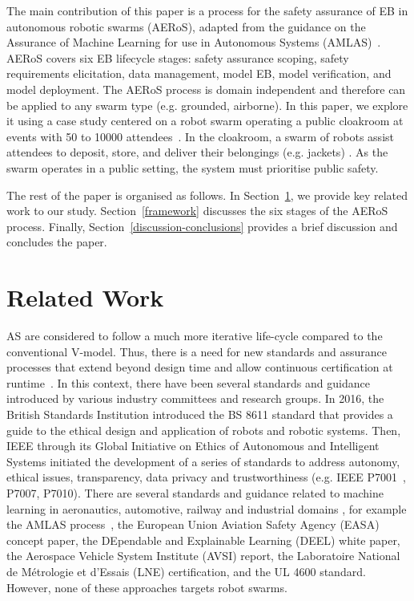 \documentclass{article}
\begin{document}
The main contribution of this paper is a process for the safety assurance of EB in autonomous robotic swarms (AERoS), adapted from the guidance on the Assurance of Machine Learning for use in Autonomous Systems (AMLAS)~\cite{Hawkins2021}. 
AERoS covers six EB lifecycle stages: safety assurance scoping, safety requirements elicitation, data management, model EB, model verification, and  model deployment. 
The AERoS process is domain independent and therefore can be applied to any swarm type (e.g. grounded, airborne). 
In this paper, we explore it using a case study centered on a robot swarm operating a public cloakroom at events with 50 to 10000 attendees~\cite{Jones2020}. 
In the cloakroom, a swarm of robots assist attendees to deposit, store, and deliver their belongings (e.g. jackets) \cite{Jones2020}. 
As the swarm operates in a public setting, the system must prioritise public safety. 

The rest of the paper is organised as follows. 
In Section~\ref{relatedwork}, we provide key related work to our study. Section~\ref{framework} discusses the six stages of the AERoS process. Finally, Section~\ref{discussion-conclusions} provides a brief discussion and concludes the paper. 

\section{Related Work}\label{relatedwork}
AS are considered to follow a much more iterative life-cycle compared to the conventional V-model. 
Thus, there is a need for new standards and assurance processes that extend beyond design time and allow continuous certification at runtime~\cite{Rushby2008}. 
In this context, there have been several standards and guidance introduced by various industry committees and research groups. In 2016, the British Standards Institution introduced the BS 8611 standard that provides a guide to the ethical design and application of robots and robotic systems. 
Then, IEEE through its Global Initiative on Ethics of Autonomous and Intelligent Systems initiated the development of a series of standards to address autonomy, ethical issues, transparency, data privacy and trustworthiness (e.g. IEEE P7001~\cite{IEEE-P7001}, P7007, P7010).  
There are several standards and guidance related to machine learning in aeronautics, automotive, railway and industrial domains \cite{Kaakai2022}, for example the AMLAS process~\cite{Hawkins2021}, the European Union Aviation Safety Agency (EASA) concept paper, the DEpendable and Explainable Learning (DEEL) white paper, the Aerospace Vehicle System Institute (AVSI) report, the Laboratoire National de Métrologie et d'Essais (LNE) certification, and the UL 4600 standard. However, none of these approaches targets robot swarms. 
\end{document}
